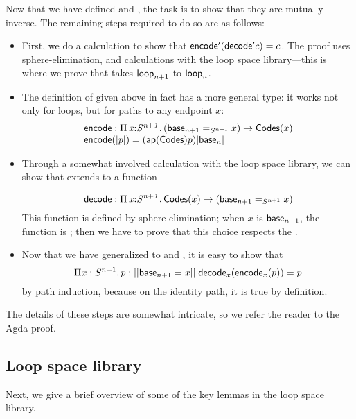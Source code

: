 Now that we have defined  and , the task is to
show that they are mutually inverse.  The remaining steps required to do
so are as follows:
\begin{itemize}
\item First, we do a calculation to show that
  $\mathsf{encode'}(\mathsf{decode'} c) = c$.  The proof uses
  sphere-elimination, and calculations with the loop space
  library---this is where we prove that  takes
  $\mathsf{loop}_{n+1}$  to $\mathsf{loop}_n$.

\item The definition of  given above in fact has a more
  general type: it works not only for loops, but for paths to any
  endpoint $x$:
\[
\begin{array}{l}
\mathsf{encode} : \textnormal{$\Pi$}\,\mathit{x} \mathit{:} \mathit{S^{n+1}}.\,\mathit{} (\mathsf{base}_{n+1} =_{S^{n+1}} x) \to \mathsf{Codes}(x)\\
\mathsf{encode}(|p|) = (\mathsf{ap}(\mathsf{Codes}) p) |\mathsf{base}_n|
\end{array}
\]

\item Through a somewhat involved calculation with the loop space library,
  we can show that  extends to a function

\[
\mathsf{decode} : \textnormal{$\Pi$}\,\mathit{x} \mathit{:} \mathit{S^{n+1}}.\,\mathit{} \mathsf{Codes}(x) \to (\mathsf{base}_{n+1} =_{S^{n+1}} x)
\]
This function is defined by sphere elimination; 
when $x$ is $\mathsf{base}_{n+1}$, the function is ; then
we have to prove that this choice respects the . 

\item Now that we have generalized to  and , it
  is easy to show that 
  \[
  \Pi x : S^{n+1}, p : || \mathsf{base}_{n+1} = x ||.  \mathsf{decode}_x(\mathsf{encode}_x(p)) = p
  \] by path
  induction, because on the identity path, it is true by definition.
\end{itemize}
%
The details of these steps are somewhat intricate, so we refer the
reader to the Agda proof.  

\subsection{Loop space library}
\label{sec:loopspace}

Next, we give a brief overview of some of the key lemmas in the loop
space library.

